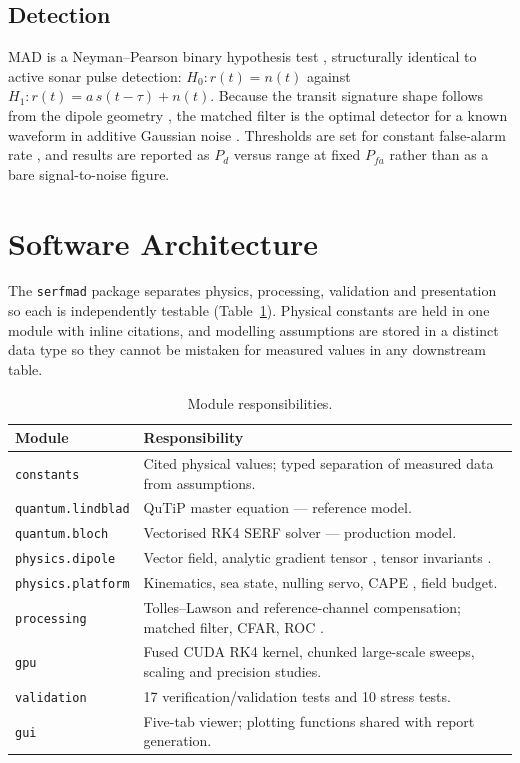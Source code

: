 \documentclass[11pt]{article}
\begin{document}
\subsection{Detection}
MAD is a Neyman--Pearson binary hypothesis test \cite{vantrees2001,kay1998},
structurally identical to active sonar pulse detection:
$H_0: r(t)=n(t)$ against $H_1: r(t)=a\,s(t-\tau)+n(t)$. Because the transit
signature shape follows from the dipole geometry \cite{jackson1998}, the matched
filter is the optimal detector for a known waveform in additive Gaussian noise
\cite{vantrees2001}. Thresholds are set for constant false-alarm rate
\cite{kay1998}, and results are reported as $P_d$ versus range at fixed $P_{fa}$
rather than as a bare signal-to-noise figure.

\section{Software Architecture}
The \texttt{serfmad} package separates physics, processing, validation and
presentation so each is independently testable (Table~\ref{tab:arch}). Physical
constants are held in one module with inline citations, and modelling assumptions
are stored in a distinct data type so they cannot be mistaken for measured values
in any downstream table.

\begin{table}[htbp]\centering\small
\begin{tabular}{p{3.3cm}p{11.7cm}}
\toprule
\textbf{Module}&\textbf{Responsibility}\\
\midrule
\texttt{constants}&Cited physical values; typed separation of measured data from assumptions.\\
\texttt{quantum.lindblad}&QuTiP \cite{qutip2013} master equation --- reference model.\\
\texttt{quantum.bloch}&Vectorised RK4 SERF solver \cite{seltzer2008} --- production model.\\
\texttt{physics.dipole}&Vector field, analytic gradient tensor \cite{jackson1998}, tensor invariants \cite{wynn1975}.\\
\texttt{physics.platform}&Kinematics, sea state, nulling servo, CAPE \cite{borna2022}, field budget.\\
\texttt{processing}&Tolles--Lawson \cite{tolles1950,gnadt2022} and reference-channel compensation; matched filter, CFAR, ROC \cite{vantrees2001}.\\
\texttt{gpu}&Fused CUDA RK4 kernel, chunked large-scale sweeps, scaling and precision studies.\\
\texttt{validation}&17 verification/validation tests and 10 stress tests.\\
\texttt{gui}&Five-tab viewer; plotting functions shared with report generation.\\
\bottomrule
\end{tabular}
\caption{Module responsibilities.}\label{tab:arch}
\end{table}
\end{document}
